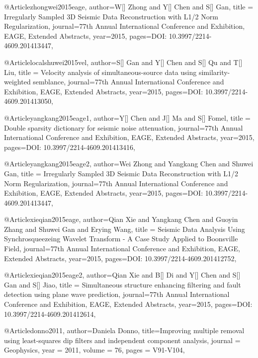 {@Article{zhongwei2015eage,
  author={W[] Zhong and Y[] Chen and S[] Gan},
  title = {Irregularly Sampled 3D Seismic Data Reconstruction with L1/2 Norm Regularization},
  journal={77th Annual International Conference and Exhibition, EAGE, Extended Abstracts},
  year=2015,
  pages={DOI: 10.3997/2214-4609.201413447},
}




@Article{localshuwei2015vel,
  author={S[] Gan and Y[] Chen and S[] Qu and T[] Liu},
  title = {Velocity analysis of simultaneous-source data using similarity-weighted semblance},
  journal={77th Annual International Conference and Exhibition, EAGE, Extended Abstracts},
  year=2015,
  pages={DOI: 10.3997/2214-4609.201413050},
}


@Article{yangkang2015eage1,
  author={Y[] Chen and J[] Ma and S[] Fomel},
  title = {Double sparsity dictionary for seismic noise attenuation},
  journal={77th Annual International Conference and Exhibition, EAGE, Extended Abstracts},
  year=2015,
  pages={DOI: 10.3997/2214-4609.201413416},
}

@Article{yangkang2015eage2,
  author={Wei Zhong and Yangkang Chen and Shuwei Gan},
  title = {Irregularly Sampled 3{D} Seismic Data Reconstruction with {L}1/2 Norm Regularization},
  journal={77th Annual International Conference and Exhibition, EAGE, Extended Abstracts},
  year=2015,
  pages={DOI: 10.3997/2214-4609.201413447},
}



@Article{xieqian2015eage,
  author={Qian Xie and Yangkang Chen and Guoyin Zhang and Shuwei Gan and Erying Wang},
  title = {Seismic Data Analysis Using Synchrosqueezeing Wavelet Transform - A Case Study Applied to Boonsville Field},
  journal={77th Annual International Conference and Exhibition, EAGE, Extended Abstracts},
  year=2015,
  pages={DOI: 10.3997/2214-4609.201412752},
}

@Article{xieqian2015eage2,
  author={Qian Xie and B[] Di and Y[] Chen and S[] Gan and S[] Jiao},
  title = {Simultaneous structure enhancing filtering and fault detection using plane wave prediction},
  journal={77th Annual International Conference and Exhibition, EAGE, Extended Abstracts},
  year=2015,
  pages={DOI: 10.3997/2214-4609.201412614},
}

@Article{donno2011,
  author={Daniela Donno},
  title={Improving multiple removal using least-squares dip filters
and independent component analysis},
  journal = 	 {Geophysics},
  year = 	 2011,
  volume =	 76,
  pages =	 {V91-V104},
}


}

